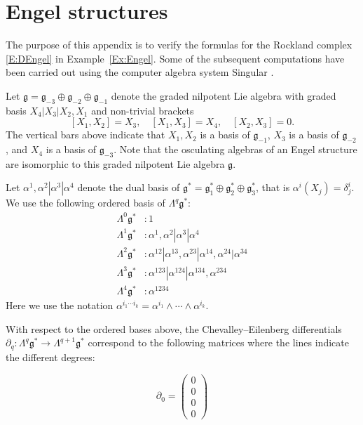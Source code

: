 \documentclass[reqno,12pt]{amsart}
\newcommand\goe{\mathfrak g}
\theoremstyle{plain}
\theoremstyle{definition}
\begin{document}
\appendix






\section{Engel structures}\label{A:Engel}




The purpose of this appendix is to verify the formulas for the Rockland complex \eqref{E:DEngel} in Example~\ref{Ex:Engel}.
Some of the subsequent computations have been carried out using the computer algebra system Singular \cite{DGPS16}.


Let $\goe=\goe_{-3}\oplus\goe_{-2}\oplus\goe_{-1}$ denote the graded nilpotent Lie algebra with graded basis $X_4|X_3|X_2,X_1$ and non-trivial brackets
$$
[X_1,X_2]=X_3,\quad[X_1,X_3]=X_4,\quad[X_2,X_3]=0.
$$
The vertical bars above indicate that $X_1,X_2$ is a basis of $\goe_{-1}$, $X_3$ is a basis of $\goe_{-2}$, and $X_4$ is a basis of $\goe_{-3}$.
Note that the osculating algebras of an Engel structure are isomorphic to this graded nilpotent Lie algebra $\goe$.


Let $\alpha^1,\alpha^2|\alpha^3|\alpha^4$ denote the dual basis of $\goe^*=\goe^*_1\oplus\goe^*_2\oplus\goe^*_3$, that is $\alpha^i(X_j)=\delta^i_j$.
We use the following ordered basis of $\Lambda^q\goe^*$:
\begin{align*}
\Lambda^0\goe^*&:1\\
\Lambda^1\goe^*&:\alpha^1,\alpha^2|\alpha^3|\alpha^4\\
\Lambda^2\goe^*&:\alpha^{12}|\alpha^{13},\alpha^{23}|\alpha^{14},\alpha^{24}|\alpha^{34}\\
\Lambda^3\goe^*&:\alpha^{123}|\alpha^{124}|\alpha^{134},\alpha^{234}\\
\Lambda^4\goe^*&:\alpha^{1234}
\end{align*}
Here we use the notation $\alpha^{i_1\cdots i_k}=\alpha^{i_1}\wedge\cdots\wedge\alpha^{i_k}$.


With respect to the ordered bases above, the Chevalley--Eilenberg differentials $\partial_q\colon\Lambda^q\goe^*\to\Lambda^{q+1}\goe^*$
correspond to the following matrices where the lines indicate the different degrees:

$$
\partial_0=\left(\begin{array}{c}
0\\0\\\hline0\\\hline0
\end{array}\right)
$$
\end{document}
